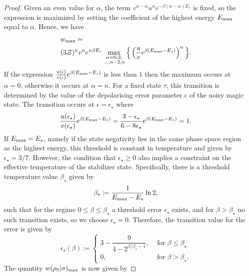 \documentclass[pra,
aps,
twocolumn,
superscriptaddress,
groupedaddress,
nofootinbib,
reprint
]{revtex4-1}
\begin{document}
\begin{proof}
Given an even value for $\alpha$, the term $v^{n-\alpha} u^{\alpha} e^{-\beta (n-\alpha)E_s}$ is fixed, so the expression is maximized by setting the coefficient of the highest energy $E_{\rm{max}}$ equal to $\alpha$.
Hence, we have
\begin{align}
	&w_{\rm max} = \nonumber\\
	&(3\mathcal{Z})^{n} v^n e^{n\beta E_s}\max\limits_{\substack{\alpha = 0,2, \\ \dots,n-2,n}}{\Big\{ \left( \frac{u}{v} e^{\beta (E_{\rm{max}} - E_s)} \right)^{\alpha} \Big\}}.
\end{align}
If the expression $\frac{u(\epsilon)}{v(\epsilon)} e^{\beta (E_{\rm{max}} - E_s)}$ is less than $1$ then the maximum occurs at $\alpha=0$, otherwise it occurs at $\alpha = n$. For a fixed state $\tau$, this transition is determined by the value of the depolarising error parameter $\epsilon$ of the noisy magic state. The transition occurs at $\epsilon = \epsilon_\star$ where
\begin{equation}\label{eq:noise_transition}
	\frac{u(\epsilon_\star)}{v(\epsilon_\star)} e^{\beta (E_{\rm{max}} - E_s)} = \frac{3-\epsilon_\star}{6-8\epsilon_\star} e^{\beta (E_{\rm{max}} - E_s)} = 1.
\end{equation}
If $E_{\rm{max}} = E_s$, namely if the state negativity lies in the same phase space region as the highest energy, this threshold is constant in temperature and given by $\epsilon_{\star} = 3/7$. However, the condition that $\epsilon_\star \ge 0$ also implies a constraint on the effective temperature of the stabilizer state. Specifically, there is a threshold temperature value $\beta_\star$ given by
\begin{equation}
	\beta_{\star} \coloneqq \frac{1}{E_{\rm{max}} - E_s} \ln2,
\end{equation}
such that for the regime $0 \leq \beta \leq \beta_\star$ a threshold error $\epsilon_\star$ exists, and for $\beta > \beta_\star$ no such transition exists, so we choose $\epsilon_\star = 0$. 
Therefore, the transition value for the error is given by
\begin{equation}
	\epsilon_{\star}(\beta) \coloneqq 
	\begin{cases}
		3 - \dfrac{9}{4-2^{\beta/\beta_\star - 1}}, &\text{ for } \beta \leq \beta_\star \\
		0, &\text{ for } \beta > \beta_\star.
	\end{cases}
\end{equation}
The quantity $w(\rho_{\rm{S}} | \sigma)_{\rm{max}}$ is now given by

\end{proof}
\end{document}
